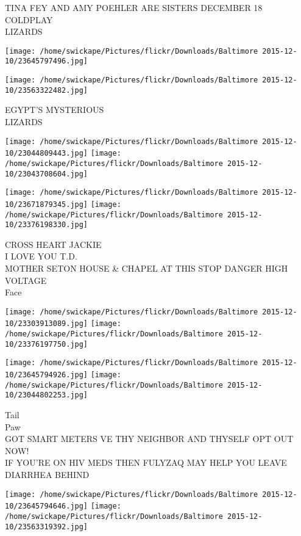 \documentclass[10pt,letterpaper]{article}
\begin{document}
TINA FEY AND AMY POEHLER ARE SISTERS DECEMBER 18\\
COLDPLAY\\
LIZARDS
\pagebreak

\texttt{[image: /home/swickape/Pictures/flickr/Downloads/Baltimore 2015-12-10/23645797496.jpg]}

\vspace{0.25in}
\texttt{[image: /home/swickape/Pictures/flickr/Downloads/Baltimore 2015-12-10/23563322482.jpg]}

EGYPT'S MYSTERIOUS\\
LIZARDS
\pagebreak

\texttt{[image: /home/swickape/Pictures/flickr/Downloads/Baltimore 2015-12-10/23044809443.jpg]}
\texttt{[image: /home/swickape/Pictures/flickr/Downloads/Baltimore 2015-12-10/23043708604.jpg]}

\texttt{[image: /home/swickape/Pictures/flickr/Downloads/Baltimore 2015-12-10/23671879345.jpg]}
\texttt{[image: /home/swickape/Pictures/flickr/Downloads/Baltimore 2015-12-10/23376198330.jpg]}

CROSS HEART JACKIE\\
I LOVE YOU T.D.\\
MOTHER SETON HOUSE \& CHAPEL AT THIS STOP DANGER HIGH VOLTAGE\\
Face
\pagebreak

\texttt{[image: /home/swickape/Pictures/flickr/Downloads/Baltimore 2015-12-10/23303913089.jpg]}
\texttt{[image: /home/swickape/Pictures/flickr/Downloads/Baltimore 2015-12-10/23376197750.jpg]}

\texttt{[image: /home/swickape/Pictures/flickr/Downloads/Baltimore 2015-12-10/23645794926.jpg]}
\texttt{[image: /home/swickape/Pictures/flickr/Downloads/Baltimore 2015-12-10/23044802253.jpg]}

Tail\\
Paw\\
GOT SMART METERS VE THY NEIGHBOR AND THYSELF OPT OUT NOW!\\
IF YOU'RE ON HIV MEDS THEN FULYZAQ MAY HELP YOU LEAVE DIARRHEA BEHIND
\pagebreak

\texttt{[image: /home/swickape/Pictures/flickr/Downloads/Baltimore 2015-12-10/23645794646.jpg]}
\texttt{[image: /home/swickape/Pictures/flickr/Downloads/Baltimore 2015-12-10/23563319392.jpg]}
\end{document}
